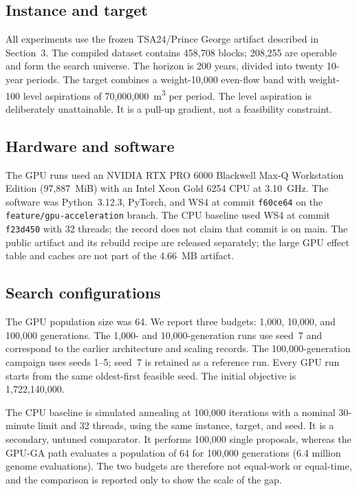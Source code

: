 \documentclass[preprint,11pt]{elsarticle}
\begin{document}
\subsection{Instance and target}

All experiments use the frozen TSA24/Prince George artifact described in
Section~3. The compiled dataset contains 458,708 blocks; 208,255 are operable and
form the search universe. The horizon is 200 years, divided into twenty 10-year
periods. The target combines a weight-10,000 even-flow band with weight-100 level
aspirations of 70,000,000~m\textsuperscript{3} per period. The level aspiration is deliberately
unattainable. It is a pull-up gradient, not a feasibility constraint.

\subsection{Hardware and software}

The GPU runs used an NVIDIA RTX PRO 6000 Blackwell Max-Q Workstation Edition
(97,887~MiB) with an Intel Xeon Gold 6254 CPU at 3.10~GHz. The software was
Python~3.12.3, PyTorch, and WS4 \citep{ws4} at commit \texttt{f60ce64} on the
\texttt{feature/gpu-acceleration} branch. The CPU baseline used WS4 at commit
\texttt{f23d450} with 32 threads; the record does not claim that commit is on main. The public artifact and its rebuild recipe are
released separately; the large GPU effect table and caches are not part of the
4.66~MB artifact.

\subsection{Search configurations}

The GPU population size was 64. We report three budgets: 1,000, 10,000, and
100,000 generations. The 1,000- and 10,000-generation runs use seed~7 and
correspond to the earlier architecture and scaling records. The
100,000-generation campaign uses seeds 1--5; seed~7 is retained as a reference
run. Every GPU run starts from the same oldest-first feasible seed. The initial
objective is 1,722,140,000.

The CPU baseline is simulated annealing at 100,000 iterations with a nominal
30-minute limit and 32 threads, using the same instance, target, and seed. It is a
secondary, untuned comparator. It performs 100,000 single proposals, whereas the
GPU-GA path evaluates a population of 64 for 100,000 generations (6.4 million
genome evaluations). The two budgets are therefore not equal-work or equal-time,
and the comparison is reported only to show the scale of the gap.
\end{document}

